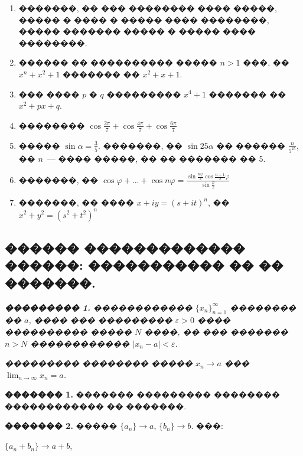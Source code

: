 \documentclass[a4paper,12pt]{article}
\begin{document}
\begin{enumerate}
\item �������, �� ��� �������� ���� �����, ����� � ���� � ����� ���� ��������, ����� ������� ����� � ����� ���� ��������.

\item ������ �� ���������� ����� $n>1$ ���, �� $x^{n}+x^{2}+1$ ������� �� $x^{2}+x+1$.

\item ��� ���� $p$ � $q$ ��������� $x^{4}+1$ ������� �� $x^{2}+px+q$.

\item �������� $\cos \frac{2\pi}{7}+\cos \frac{4\pi}{7}+\cos \frac{6\pi}{7}$

\item ����� $\sin \alpha = \frac{3}{5}$. �������, �� $\sin 25\alpha$ �� ������ $\frac{n}{5^{25}}$, �� $n$~--- ���� �����, �� �� ������� �� 5.

\item �������, �� $\cos \varphi + ... + \cos n\varphi = \frac{\sin \frac{n\varphi}{2} \cos \frac{n+1}{2}\varphi}{\sin \frac{\varphi}{2}}$

\item �������, �� ���� $x+iy=(s+it)^{n}$, �� $x^{2}+y^{2}=(s^{2}+t^{2})^{n}$
\end{enumerate}








\newpage

\begin{center}
\section*{������ ������������� ������: ����������� �� �� �������.}
\end{center}

\quad \textit{\textbf{��������� 1.}} \textit{������������ $\{x_{n}\}_{n=1}^{\infty}$ �������� �� $a$, ���� ��� ��������� $\varepsilon>0$ ���� ���������� ����� $N$ ����, �� ��� ������� $n>N$ ������������ $|x_{n}-a|<\varepsilon$. }

\textit{��������� �������� ����� $x_{n}\rightarrow a$ ��� $\lim_{n\rightarrow \infty}^{}x_{n}=a$.}

\textbf{������� 1.} ������� ��������� �������� ������������ �� �������.

\textbf{������� 2.} ����� $\{a_{n}\}\rightarrow a$, $\{b_{n}\}\rightarrow b$. ���:

$\{a_{n}+b_{n}\}\rightarrow a+b$,
\end{document}
